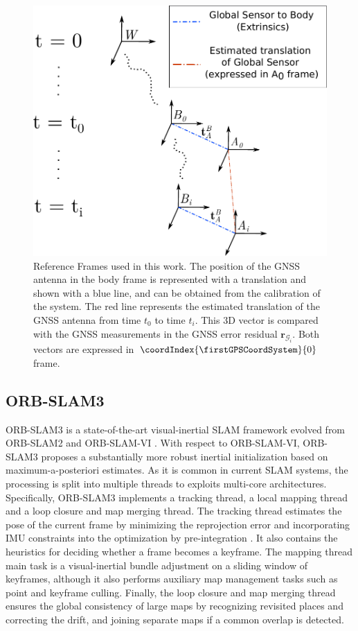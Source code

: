 \begin{figure}[!t]
    \centering
    \includegraphics[width=\linewidth]{images/frames.pdf}
    \caption{Reference Frames used in this work. The position of the GNSS antenna in the body frame is represented with a translation and shown with a blue line, and can be obtained from the calibration of the system. The red line represents the estimated translation of the GNSS antenna from time $t_0$ to time $t_i$. This 3D vector is compared with the GNSS measurements in the GNSS error residual $\mathbf{r}_{\mathcal{G}_{i}}$. Both vectors are expressed in ${\coordIndex{\firstGPSCoordSystem}{0}}$ frame.}
    \label{fig:frames}
\end{figure}

\subsection{ORB-SLAM3}
ORB-SLAM3 is a state-of-the-art visual-inertial SLAM framework evolved from ORB-SLAM2 \cite{mur2017orb} and ORB-SLAM-VI \cite{mur2017visual}. With respect to ORB-SLAM-VI, ORB-SLAM3 proposes a substantially more robust inertial initialization based on maximum-a-posteriori estimates. As it is common in current SLAM systems, the processing is split into multiple threads to exploits multi-core architectures. Specifically, ORB-SLAM3 implements a tracking thread, a local mapping thread and a loop closure and map merging thread. The tracking thread estimates the pose of the current frame by minimizing the reprojection error and incorporating IMU constraints into the optimization by pre-integration \cite{forster2017onmanifold}. It also contains the heuristics for deciding whether a frame becomes a keyframe. The mapping thread main task is a visual-inertial bundle adjustment on a sliding window of keyframes, although it also performs auxiliary map management tasks such as point and keyframe culling. Finally, the loop closure and map merging thread ensures the global consistency of large maps by recognizing revisited places and correcting the drift, and joining separate maps if a common overlap is detected.

